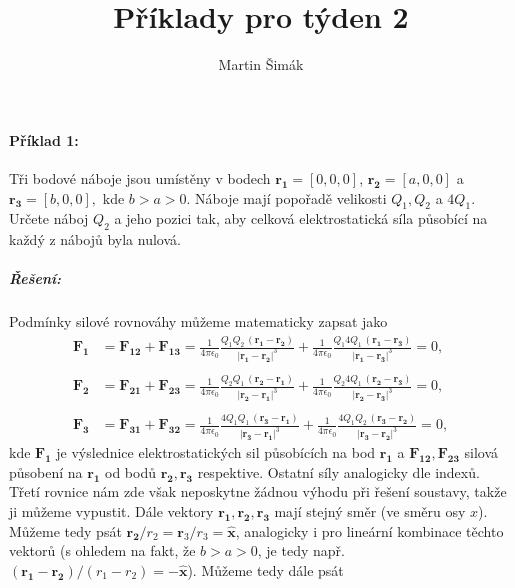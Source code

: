 \documentclass{article}
\title{Příklady pro týden 2}
\author{Martin Šimák}
\date{}
\let\oldhat\hat
\renewcommand{\hat}[1]{\oldhat{\mathbf{#1}}}
\newcommand{\vecvar}[1]{\boldsymbol{#1}}
\begin{document}
	\maketitle
	
	\paragraph{Příklad 1:}
		Tři bodové náboje jsou umístěny v bodech $\vecvar{r_1} = [0, 0, 0]$, $\vecvar{r_2} = [a,0,0]$ a $\vecvar{r_3} = [b,0,0],$ kde $b > a > 0.$ Náboje mají popořadě velikosti $Q_1, Q_2$ a $4Q_1.$ Určete náboj $Q_2$ a jeho pozici tak, aby celková elektrostatická síla působící na každý z nábojů byla nulová.
	
	\subparagraph{Řešení:}
		Podmínky silové rovnováhy můžeme matematicky zapsat jako
		\begin{align*}
			\vecvar{F_1} &= \vecvar{F_{12}} + \vecvar{F_{13}} = \frac{1}{4 \pi \epsilon_0} \frac{Q_1 Q_2 \, (\vecvar{r_1} - \vecvar{r_2})}{|\vecvar{r_1} - \vecvar{r_2}|^3} + \frac{1}{4 \pi \epsilon_0} \frac{Q_1 4 Q_1 \, (\vecvar{r_1} - \vecvar{r_3})}{|\vecvar{r_1} - \vecvar{r_3}|^3} = 0 , \\ \\
			\vecvar{F_2} &= \vecvar{F_{21}} + \vecvar{F_{23}} = \frac{1}{4 \pi \epsilon_0} \frac{Q_2 Q_1 \, (\vecvar{r_2} - \vecvar{r_1})}{|\vecvar{r_2} - \vecvar{r_1}|^3} + \frac{1}{4 \pi \epsilon_0} \frac{Q_2 4 Q_1 \, (\vecvar{r_2} - \vecvar{r_3})}{|\vecvar{r_2} - \vecvar{r_3}|^3} = 0 , \\ \\
			\vecvar{F_3} &= \vecvar{F_{31}} + \vecvar{F_{32}} = \frac{1}{4 \pi \epsilon_0} \frac{4 Q_1 Q_1 \, (\vecvar{r_3} - \vecvar{r_1})}{|\vecvar{r_3} - \vecvar{r_1}|^3} + \frac{1}{4 \pi \epsilon_0} \frac{4 Q_1 Q_2 \, (\vecvar{r_3} - \vecvar{r_2})}{|\vecvar{r_3} - \vecvar{r_2}|^3} = 0 ,
		\end{align*}
		kde $\vecvar{F_1}$ je výslednice elektrostatických sil působících na bod $\vecvar{r_1}$ a $\vecvar{F_{12}}, \vecvar{F_{23}}$ silová působení na $\vecvar{r_1}$ od bodů $\vecvar{r_2}, \vecvar{r_3}$ respektive. Ostatní síly analogicky dle indexů. \\
		Třetí rovnice nám zde však neposkytne žádnou výhodu při řešení soustavy, takže ji můžeme vypustit. Dále vektory $\vecvar{r_1}, \vecvar{r_2}, \vecvar{r_3}$ mají stejný směr (ve směru osy $x$). Můžeme tedy psát $\vecvar{r_2}/r_2 = \vecvar r_3/r_3 = \hat{x}$, analogicky i pro lineární kombinace těchto vektorů (s ohledem na fakt, že $b > a > 0$, je tedy např. $(\vecvar{r_1} - \vecvar{r_2})/(r_1 - r_2) = - \hat{x}$). Můžeme tedy dále psát
\end{document}
